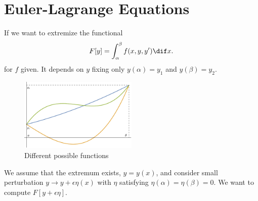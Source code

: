 \section{Euler-Lagrange Equations}
If we want to extremize the functional
\begin{equation}
    F[y] = \int_{\alpha}^{\beta} f(x, y, y') \dif x.
    \label{eleq}
\end{equation}
for \(f\) given. It depends on \(y\) fixing only \(y(\alpha) = y_1\) and \(y(\beta) = y_2\).
\begin{figure}[htpb]
    \centering
    \includegraphics[width=0.5\textwidth]{Figures/fig_2_1.pdf}
    \caption{Different possible functions}
    \label{fig_2_1}
\end{figure}
We assume that the extremum exists, \(y = y(x)\), and consider small perturbation \(y \to y + \epsilon \eta(x)\) with \(\eta\) satisfying \(\eta(\alpha) = \eta(\beta) = 0\). We want to compute \(F[y + \epsilon \eta]\).

